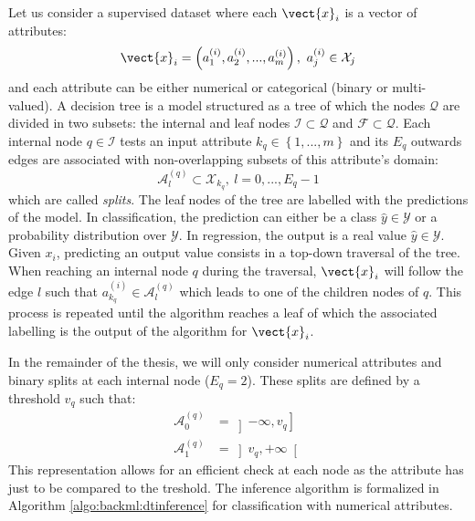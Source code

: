 Let us consider a supervised dataset where each $\vect{x}_i$ is a vector of attributes:
\begin{equation}
\label{eqn:backml:dt:vectattributes}
\vect{x}_i = \left(a^{(i)}_1, a^{(i)}_2, ..., a^{(i)}_m\right),~a^{(i)}_j \in \mathcal{X}_j
\end{equation}
and each attribute can be either numerical or categorical (binary or multi-valued). A decision tree is a model structured as a tree of which the nodes $\mathcal{Q}$ are divided in two subsets: the internal and leaf nodes $\mathcal{I} \subset \mathcal{Q}$ and $\mathcal{F} \subset \mathcal{Q}$. Each internal node $q \in \mathcal{I}$ tests an input attribute $k_q \in \left\{1,...,m\right\}$ and its $E_q$ outwards edges are associated with non-overlapping subsets of this attribute's domain:
\begin{equation}
\label{eqn:backml:dt:splitsgeneric}
\mathcal{A}^{(q)}_l \subset \mathcal{X}_{k_q},~l = 0,...,E_q-1
\end{equation}
which are called \textit{splits}. The leaf nodes of the tree are labelled with the predictions of the model. In classification, the prediction can either be a class $\hat{y} \in \mathcal{Y}$ or a probability distribution over $\mathcal{Y}$. In regression, the output is a real value $\hat{y} \in \mathcal{Y}$. Given $x_i$, predicting an output value consists in a top-down traversal of the tree. When reaching an internal node $q$ during the traversal, $\vect{x}_i$ will follow the edge $l$ such that $a^{(i)}_{k_q} \in \mathcal{A}^{(q)}_l$ which leads to one of the children nodes of $q$. This process is repeated until the algorithm reaches a leaf of which the associated labelling is the output of the algorithm for $\vect{x}_i$. 

In the remainder of the thesis, we will only consider numerical attributes and binary splits at each internal node ($E_q = 2$). These splits are defined by a threshold $v_q$ such that:
\begin{align}
\label{eqn:backml:dt:splitsbinary}
\mathcal{A}^{(q)}_0 &= \left]-\infty, v_q\right]\\
\mathcal{A}^{(q)}_1 &= \left]v_q, +\infty\right[
\end{align}
This representation allows for an efficient check at each node as the attribute has just to be compared to the treshold. The inference algorithm is formalized in Algorithm \ref{algo:backml:dtinference} for classification with numerical attributes. 


